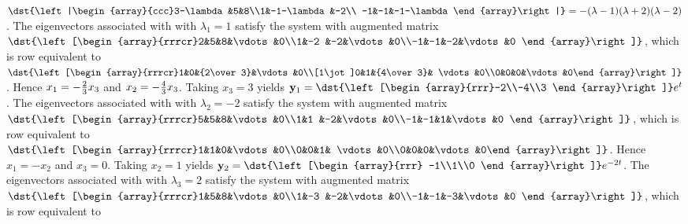 \documentclass[dvips]{book}
\renewcommand{\exer}[1]{\par\medskip\;\noindent{\color{red}\bf #1.}}
\numberwithin{example}{section}
\numberwithin{equation}{section}
\numberwithin{theorem}{section}
\numberwithin{table}{section}
\numberwithin{figure}{section}
\begin{document}
\exer{10.4.10}
$\dst{\left|\begin{array}{ccc}3-\lambda&5&8\\1&-1-\lambda&-2\\
-1&-1&-1-\lambda\end{array}\right|}=-(\lambda-1)(\lambda+2)(\lambda-2)$.
The eigenvectors associated with
 with $\lambda_1=1$ satisfy the system with  augmented matrix
$\dst{\left[\begin{array}{rrrcr}2&5&8&\vdots&0\\1&-2
&-2&\vdots&0\\-1&-1&-2&\vdots&0
\end{array}\right]}$,
which is row equivalent to
$\dst{\left[\begin{array}{rrrcr}1&0&{2\over3}&\vdots&0\\[1\jot]0&1&{4\over3}&
\vdots&0\\0&0&0&\vdots&0\end{array}\right]}$.
Hence $x_1=-{2\over3}x_3$ and $x_2=-{4\over3}x_3$.  Taking $x_3=3$
yields
${\bf y}_1=\dst{\left[\begin{array}{rrr}-2\\-4\\3
\end{array}\right]}e^t$.
The eigenvectors associated with
 with $\lambda_2=-2$ satisfy the system with  augmented matrix
$\dst{\left[\begin{array}{rrrcr}5&5&8&\vdots&0\\1&1
&-2&\vdots&0\\-1&-1&1&\vdots&0
\end{array}\right]}$,
which is row equivalent to
$\dst{\left[\begin{array}{rrrcr}1&1&0&\vdots&0\\0&0&1&
\vdots&0\\0&0&0&\vdots&0\end{array}\right]}$.
Hence $x_1=-x_2$ and $x_3=0$.  Taking $x_2=1$ yields
${\bf y}_2=\dst{\left[\begin{array}{rrr} -1\\1\\0
\end{array}\right]}e^{-2t}$.
The eigenvectors associated with
 with $\lambda_3=2$ satisfy the system with  augmented matrix
$\dst{\left[\begin{array}{rrrcr}1&5&8&\vdots&0\\1&-3
&-2&\vdots&0\\-1&-1&-3&\vdots&0
\end{array}\right]}$,
which is row equivalent to
\end{document}
